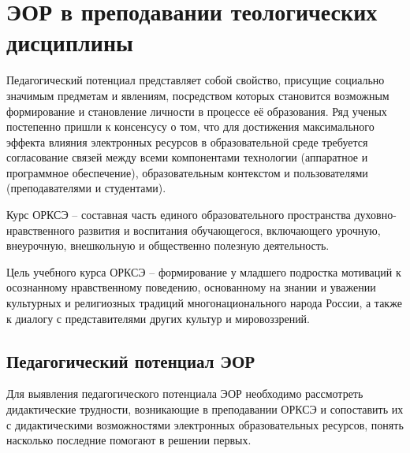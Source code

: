 \large
\section{ЭОР в преподавании теологических дисциплины}
Педагогический потенциал представляет собой свойство, присущие социально значимым предметам и явлениям, посредством которых становится возможным формирование и становление личности в процессе её образования. Ряд ученых постепенно пришли к консенсусу о том, что для достижения максимального эффекта влияния электронных ресурсов в образовательной среде требуется согласование связей между всеми компонентами технологии (аппаратное и программное обеспечение), образовательным контекстом и пользователями (преподавателями и студентами)\cite{ivinskaya22}.

Курс ОРКСЭ – составная часть единого образовательного пространства духовно-нравственного развития и воспитания обучающегося, включающего урочную, внеурочную, внешкольную и общественно полезную деятельность.

Цель учебного курса ОРКСЭ – формирование у младшего подростка мотиваций к осознанному нравственному поведению, основанному на знании и уважении культурных и религиозных традиций многонационального народа России, а также к диалогу с представителями других культур и мировоззрений.

\subsection{Педагогический потенциал ЭОР}
\label{section2}
Для выявления педагогического потенциала ЭОР необходимо рассмотреть дидактические трудности, возникающие в преподавании ОРКСЭ и сопоставить их с дидактическими возможностями электронных образовательных ресурсов, понять насколько последние помогают в решении первых.

